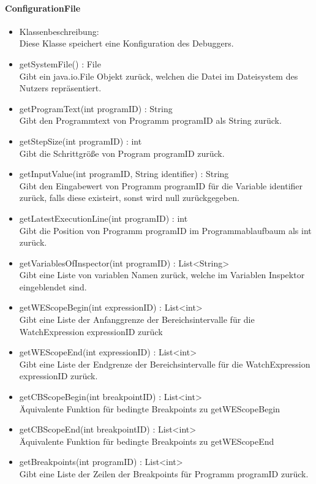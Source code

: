 ﻿\documentclass[parskip=full]{scrartcl}
\begin{document}
\paragraph{ConfigurationFile}
\begin{itemize}
\item Klassenbeschreibung: \\
Diese Klasse speichert eine Konfiguration des Debuggers.
\item getSystemFile() : File \\
Gibt ein java.io.File Objekt zurück, welchen die Datei im Dateisystem des Nutzers repräsentiert.
\item getProgramText(int programID) : String \\
Gibt den Programmtext von Programm programID als String zurück.
\item getStepSize(int programID) : int \\
Gibt die Schrittgröße von Program programID zurück.
\item getInputValue(int programID, String identifier) : String \\
Gibt den Eingabewert von Programm programID für die Variable identifier zurück, falls diese existeirt,
sonst wird null zurückgegeben.
\item getLatestExecutionLine(int programID) : int \\
Gibt die Position von Programm programID im Programmablaufbaum als int zurück. %
\item getVariablesOfInspector(int programID) : List<String> \\
Gibt eine Liste von variablen Namen zurück, welche im Variablen Inspektor eingeblendet sind.
\item getWEScopeBegin(int expressionID) : List<int> \\
Gibt eine Liste der Anfanggrenze der Bereichsintervalle für die WatchExpression expressionID zurück
\item getWEScopeEnd(int expressionID) : List<int> \\
Gibt eine Liste der Endgrenze der Bereichsintervalle für die WatchExpression expressionID zurück.
\item getCBScopeBegin(int breakpointID) : List<int> \\
Äquivalente Funktion für bedingte Breakpoints zu getWEScopeBegin
\item getCBScopeEnd(int breakpointID) : List<int> \\
Äquivalente Funktion für bedingte Breakpoints zu getWEScopeEnd
\item getBreakpoints(int programID) : List<int> \\
Gibt eine Liste der Zeilen der Breakpoints für Programm programID zurück.
\end{itemize}
\end{document}
